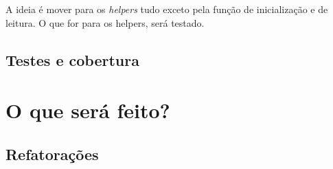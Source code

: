 A ideia é mover para os \emph{helpers} tudo exceto pela função de inicialização e de leitura. O que for para os helpers,
será testado.

\subsection{Testes e cobertura}
\label{subsec:testes-cobertura}

\section{O que será feito?}
\label{sec:what-will-be-done}

\subsection{Refatorações}\label{subsec:refatoracoes}

